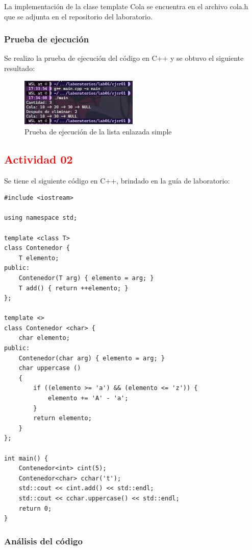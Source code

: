 La implementación de la clase template Cola se encuentra en el archivo cola.h que se adjunta en el repositorio del laboratorio.

\subsubsection{Prueba de ejecución}

Se realizo la prueba de ejecución del código en C++ y se obtuvo el siguiente resultado:

\begin{figure}[H]
    \centering
    \includegraphics[width=0.5\textwidth]{img/Prueba01.png}
    \caption{Prueba de ejecución de la lista enlazada simple}
    \label{fig:qt_app}
\end{figure}




\subsection{\textcolor{red}{Actividad 02}}

Se tiene el siguiente código en C++, brindado en la guía de laboratorio:

\begin{lstlisting}[style=cpp-style, caption={Código en C++ brindado en la guía de laboratorio}]
#include <iostream>

using namespace std;

template <class T>
class Contenedor {
    T elemento;
public:
    Contenedor(T arg) { elemento = arg; }
    T add() { return ++elemento; }
};

template <>
class Contenedor <char> {
    char elemento;
public:
    Contenedor(char arg) { elemento = arg; }
    char uppercase ()
    {
        if ((elemento >= 'a') && (elemento <= 'z')) {
            elemento += 'A' - 'a';
        }
        return elemento;
    }
};

int main() {
    Contenedor<int> cint(5);
    Contenedor<char> cchar('t');
    std::cout << cint.add() << std::endl;
    std::cout << cchar.uppercase() << std::endl;
    return 0;
}
\end{lstlisting}

\subsubsection{Análisis del código}

